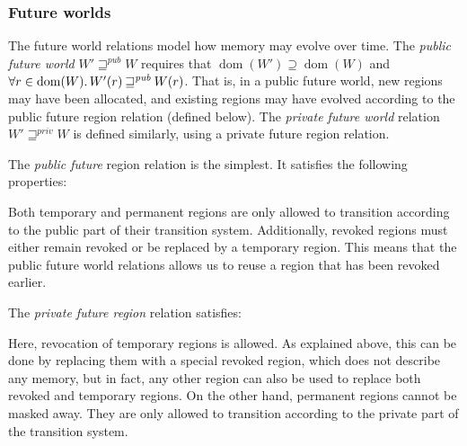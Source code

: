 \documentclass[compsoc,conference,letterpaper,fleqn]{IEEEtran}
\DeclareMathOperator{\dom}{dom}
\newcommand\lau[1]{{\color{purple} \sf \footnotesize {LS: #1}}\\}
\newcommand\dominique[1]{{\color{purple} \sf \footnotesize {DD: #1}}\\}
\renewcommand\lau[1]{}
\renewcommand\dominique[1]{}
\newcommand{\var}[1]{\mathit{#1}}
\newcommand{\pub}{\var{pub}}
\newcommand{\futurewk}{\mathbin{\sqsupseteq}^{\var{pub}}}
\newcommand{\futurestr}{\mathbin{\sqsupseteq}^{\var{priv}}}
\newcommand{\plaindom}[1]{\mathrm{#1}}
\newcommand{\Regions}{\plaindom{Region}}
\newcommand{\plainview}[1]{\mathrm{#1}}
\newcommand{\temp}{\plainview{temp}}
\newcommand{\revoked}{\plainview{revoked}}
\begin{document}
\subsubsection{Future worlds}
The future world relations model how memory may evolve over time. The
\emph{public future world} $W' \futurewk W$ requires that $\dom(W') \supseteq
\dom(W)$ and $\forall r \in \dom(W) \ldotp W'(r) \futurewk W(r)$. That is, in a
public future world, new regions may have been allocated, and existing regions
may have evolved according to the public future region relation (defined below).
The \emph{private future world} relation $W' \futurestr W$ is defined similarly,
using a private future region relation.

The \emph{public future} region relation is the simplest. It satisfies
the following properties:
Both temporary and permanent regions are only allowed to transition according to
the public part of their transition system. Additionally, revoked regions must
either remain revoked or be replaced by a temporary region. This means that the
public future world relations allows us to reuse a region that has been revoked
earlier.

The \emph{private future region} relation satisfies:
Here, revocation of temporary regions is allowed. As explained above, this can
be done by replacing them with a special revoked region, which does not describe
any memory, but in fact, any other region can also be used to replace both
revoked and temporary regions. On the other hand, permanent regions cannot be
masked away. They are only allowed to transition according to the private part
of the transition system.
\end{document}
